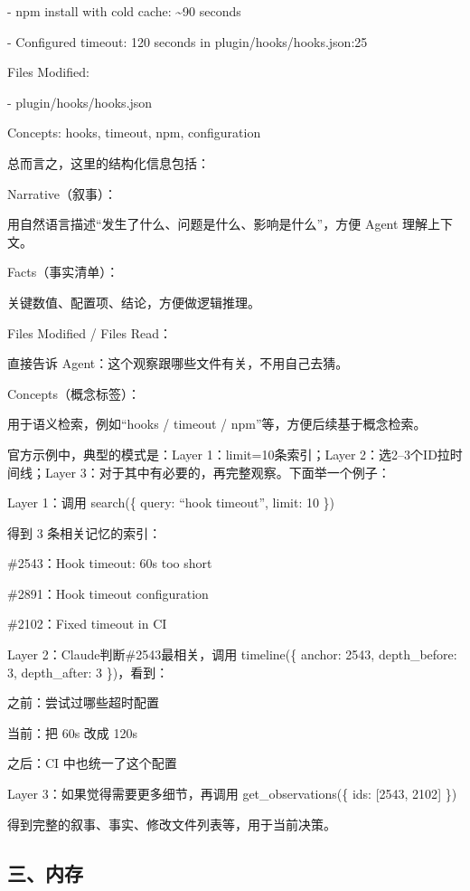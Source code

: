 - npm install with cold cache: \textasciitilde90 seconds

- Configured timeout: 120 seconds in plugin/hooks/hooks.json:25

Files Modified:

- plugin/hooks/hooks.json

Concepts: hooks, timeout, npm, configuration

总而言之，这里的结构化信息包括：

Narrative（叙事）：

用自然语言描述``发生了什么、问题是什么、影响是什么''，方便 Agent 理解上下文。

Facts（事实清单）：

关键数值、配置项、结论，方便做逻辑推理。

Files Modified / Files Read：

直接告诉 Agent：这个观察跟哪些文件有关，不用自己去猜。

Concepts（概念标签）：

用于语义检索，例如``hooks / timeout / npm''等，方便后续基于概念检索。

官方示例中，典型的模式是：Layer 1：limit=10条索引；Layer 2：选2--3个ID拉时间线；Layer 3：对于其中有必要的，再完整观察。下面举一个例子：

Layer 1：调用 search(\{ query: ``hook timeout'', limit: 10 \})

得到 3 条相关记忆的索引：

\#2543：Hook timeout: 60s too short

\#2891：Hook timeout configuration

\#2102：Fixed timeout in CI

Layer 2：Claude判断\#2543最相关，调用 timeline(\{ anchor: 2543, depth\_before: 3, depth\_after: 3 \})，看到：

之前：尝试过哪些超时配置

当前：把 60s 改成 120s

之后：CI 中也统一了这个配置

Layer 3：如果觉得需要更多细节，再调用 get\_observations(\{ ids: {[}2543, 2102{]} \})

得到完整的叙事、事实、修改文件列表等，用于当前决策。

\hypertarget{ux4e09ux5185ux5b58}{%
\subsection{三、内存}\label{ux4e09ux5185ux5b58}}


